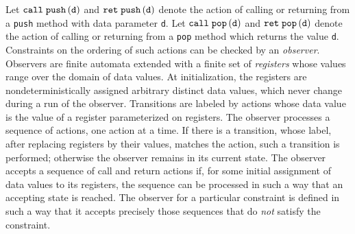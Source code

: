 Let $\mathtt{call}\; \tt push\left(\tt d\right)$ and $\mathtt{ret}\; \tt push\left(\tt d\right)$ denote the
action of calling or returning from a {\tt push} method with data parameter {\tt d}.
Let $\mathtt{call}\; \tt pop\left(\tt d\right)$ and $\mathtt{ret}\; \tt pop\left(\tt d\right)$ denote the
action of calling or returning from a {\tt pop} method which returns
the value {\tt d}.
Constraints on the ordering of such actions can be
checked by an {\em observer}.
%
Observers are
finite automata extended with a finite set of {\em registers} whose values range
over the domain of data values.
%
At initialization,
the registers are nondeterministically
assigned arbitrary distinct data values, which never change
during a run of the observer. 
%
Transitions are labeled by actions whose data value
is the value of a register parameterized on registers.%
The observer processes a sequence of actions, one action at a time.
If there is a transition, whose label, after replacing registers by their
values, matches the action, such a transition is performed; otherwise
the observer remains in its current state.
%
The observer accepts a sequence of call and return actions
if, for some initial assignment of data values to its registers, the sequence
can  be processed in such a way that an accepting state is reached.
The observer for a particular constraint is defined in such a way that it
accepts precisely those sequences  that do {\em not} satisfy the constraint.


